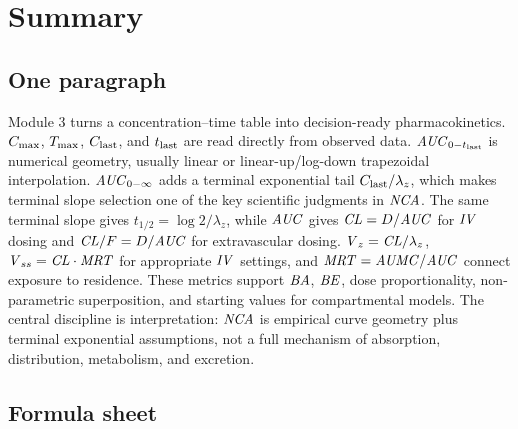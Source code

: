 \documentclass[a4paper]{article}
\newcommand{\CL}{\ensuremath{\pksym{CL}}}
\newcommand{\CLF}{\ensuremath{\pksym{CL}/F}}
\newcommand{\Vz}{\ensuremath{\pksym{V}_z}}
\newcommand{\Vss}{\ensuremath{\pksym{V}_{ss}}}
\newcommand{\AUC}{\ensuremath{\pksym{AUC}}}
\newcommand{\AUClast}{\ensuremath{\pksym{AUC}_{0-t_{\pklab{last}}}}}
\newcommand{\AUCinf}{\ensuremath{\pksym{AUC}_{0-\infty}}}
\newcommand{\AUMC}{\ensuremath{\pksym{AUMC}}}
\newcommand{\MRT}{\ensuremath{\pksym{MRT}}}
\newcommand{\Cmax}{\ensuremath{C_{\pklab{max}}}}
\newcommand{\Tmax}{\ensuremath{T_{\pklab{max}}}}
\newcommand{\Clast}{\ensuremath{C_{\pklab{last}}}}
\newcommand{\Tlast}{\ensuremath{t_{\pklab{last}}}}
\newcommand{\lambdaZ}{\ensuremath{\lambda_z}}
\newcommand{\halfLife}{\ensuremath{t_{1/2}}}
\newcommand{\NCA}{\ensuremath{\pksym{NCA}}}
\newcommand{\BA}{\ensuremath{\pksym{BA}}}
\newcommand{\BE}{\ensuremath{\pksym{BE}}}
\newcommand{\IV}{\ensuremath{\pksym{IV}}}
\begin{document}
\section{Summary}

\subsection{One paragraph}

Module 3 turns a concentration--time table into decision-ready pharmacokinetics. \Cmax{}, \Tmax{}, \Clast{}, and \Tlast{} are read directly from observed data. \AUClast{} is numerical geometry, usually linear or linear-up/log-down trapezoidal interpolation. \AUCinf{} adds a terminal exponential tail \(\Clast/\lambdaZ\), which makes terminal slope selection one of the key scientific judgments in \NCA{}. The same terminal slope gives \(\halfLife=\log 2/\lambdaZ\), while \AUC{} gives \(\CL=D/\AUC\) for \IV{} dosing and \(\CLF=D/\AUC\) for extravascular dosing. \(\Vz=\CL/\lambdaZ\), \(\Vss=\CL\cdot\MRT\) for appropriate \IV{} settings, and \(\MRT=\AUMC/\AUC\) connect exposure to residence. These metrics support \BA{}, \BE{}, dose proportionality, non-parametric superposition, and starting values for compartmental models. The central discipline is interpretation: \NCA{} is empirical curve geometry plus terminal exponential assumptions, not a full mechanism of absorption, distribution, metabolism, and excretion.

\subsection{Formula sheet}
\end{document}
